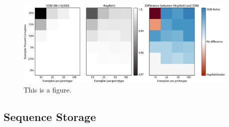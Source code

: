 \documentclass[10pt,letterpaper]{article}
\begin{document}
\begin{figure}[ht!]
\begin{center}
\includegraphics[width=0.95\textwidth]{./figures/prototype-edit.png}

\end{center}
\caption{This is a figure.} 
\label{sample-figure}
\end{figure}


\subsection{Sequence Storage}
\end{document}
